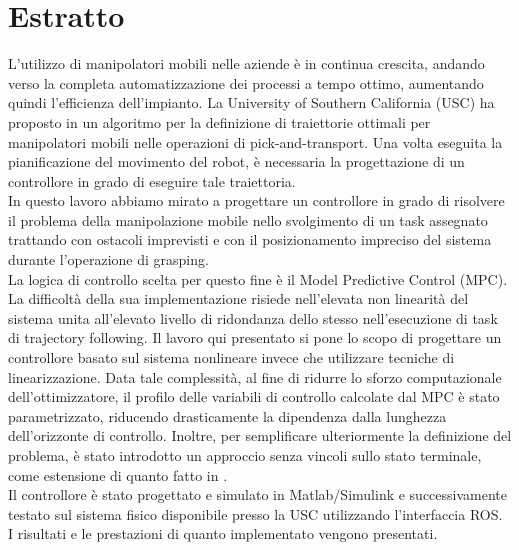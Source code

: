 	\newpage
\chapter*{Estratto}

L'utilizzo di manipolatori mobili nelle aziende è in continua crescita, andando verso la completa automatizzazione dei processi a tempo ottimo, aumentando quindi l'efficienza dell'impianto. La University of Southern California (USC) ha proposto in \cite{shantanuthakar} un algoritmo per la definizione di traiettorie ottimali per manipolatori mobili nelle operazioni di pick-and-transport. Una volta eseguita la pianificazione del movimento del robot, è necessaria la progettazione di un controllore in grado di eseguire tale traiettoria. \\
In questo lavoro abbiamo mirato a progettare un controllore in grado di risolvere il problema della manipolazione mobile nello svolgimento di un task assegnato trattando con ostacoli imprevisti e con il posizionamento impreciso del sistema durante l'operazione di grasping. \\La logica di controllo scelta per questo fine è il Model Predictive Control (MPC). La difficoltà della sua implementazione risiede nell'elevata non linearità del sistema unita all'elevato livello di ridondanza dello stesso nell'esecuzione di task di trajectory following. Il lavoro qui presentato si pone lo scopo di progettare un controllore basato sul sistema nonlineare invece che utilizzare tecniche di linearizzazione. Data tale complessità, al fine di ridurre lo sforzo computazionale dell'ottimizzatore, il profilo delle variabili di controllo calcolate dal MPC è stato parametrizzato, riducendo drasticamente la dipendenza dalla lunghezza dell'orizzonte di controllo. Inoltre, per semplificare ulteriormente la definizione del problema, è stato introdotto un approccio senza vincoli sullo stato terminale, come estensione di quanto fatto in \cite{alamir2018stability}. \\
Il controllore è stato progettato e simulato in Matlab/Simulink e successivamente testato sul sistema fisico disponibile presso la USC utilizzando l'interfaccia ROS. I risultati e le prestazioni di quanto implementato vengono presentati.

\vspace{0.5cm}
\noindent 
